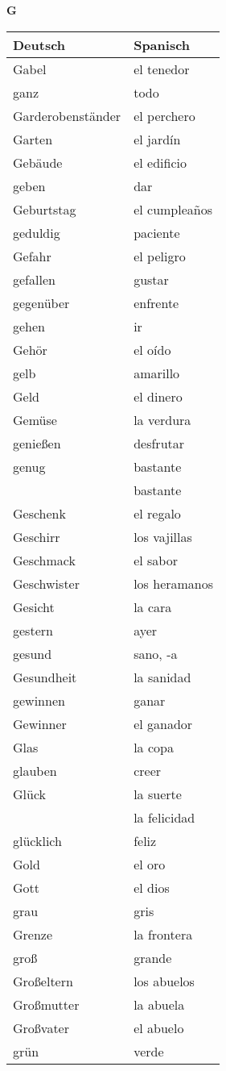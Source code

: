 \begin{flushright}\begin{Huge}\textbf{G}\end{Huge}\end{flushright}

\begin{longtable}{p{} p{}} 
\textbf{Deutsch}     & \textbf{Spanisch}                                       \\ \hline
\hline
\endhead %
Gabel & el tenedor\\
ganz & todo\\
Garderobenständer & el perchero\\
Garten & el jardín\\
Gebäude & el edificio\\
geben & dar\\
Geburtstag & el cumpleaños\\
geduldig & paciente\\
Gefahr & el peligro\\
gefallen & gustar\\
gegenüber & enfrente\\
gehen & ir\\
Gehör & el oído\\
gelb & amarillo \\
Geld & el dinero\\
Gemüse & la verdura\\
genießen & desfrutar\\
genug & bastante\\
~ & bastante\\
Geschenk & el regalo\\
Geschirr & los vajillas\\
Geschmack & el sabor\\
Geschwister & los heramanos \\
Gesicht & la cara\\
gestern & ayer\\
gesund & sano, -a\\
Gesundheit & la sanidad\\
gewinnen & ganar\\
Gewinner & el ganador\\
Glas & la copa\\
glauben & creer\\
Glück & la suerte \\
~ & la felicidad \\
glücklich & feliz\\
Gold & el oro\\
Gott & el dios\\
grau & gris \\
Grenze & la frontera\\
groß & grande\\
Großeltern & los abuelos\\
Großmutter & la abuela\\
Großvater & el abuelo\\
grün & verde\\

\end{longtable}
